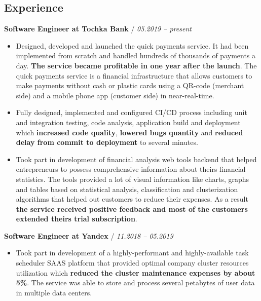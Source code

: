 \documentclass[a4paper,10pt]{article}
\newcommand{\notice}[1]{{\textcolor{dark}{\textbf{#1}}}}
\newcommand{\info}[1]{{\textcolor{darkdark}{\textbf{#1}}}}
\begin{document}
\subsection*{Experience}

    \begin{adjustwidth}{10pt}{10pt}

        \notice{Software Engineer at Tochka Bank} / \textit{05.2019 – present}

        \begin{itemize}

        \item Designed, developed and launched the quick payments service. It had been implemented from scratch and handled hundreds of thousands of payments a day. \info{The service became profitable in one year after the launch}. The quick payments service is a financial infrastructure that allows customers to make payments without cash or plastic cards using a QR-code (merchant side) and a mobile phone app (customer side) in near-real-time.

        \item Fully designed, implemented and configured CI/CD process including unit and integration testing, code analysis, application build and deployment which \info{increased code quality}, \info{lowered bugs quantity} and \info{reduced delay from commit to deployment} to several minutes.

        \item Took part in development of financial analysis web tools backend that helped entrepreneurs to possess comprehensive information about theirs financial statistics. The tools provided a lot of visual information like charts, graphs and tables based on statistical analysis, classification and clusterization algorithms that helped out customers to reduce their expenses. As a result \info{the service received positive feedback and most of the customers extended theirs trial subscription}.

        \end{itemize}


        \notice{Software Engineer at Yandex} / \textit{11.2018 – 05.2019}

        \begin{itemize}

        \item Took part in development of a highly-performant and highly-available task scheduler SAAS platform that provided optimal company cluster resources utilization which \info{reduced the cluster maintenance expenses by about 5\%}. The service was able to store and process several petabytes of user data in multiple data centers.


\end{itemize}
\end{adjustwidth}
\end{document}
